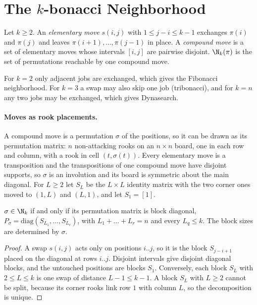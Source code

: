 
\section{The $k$-bonacci Neighborhood}

\begin{definition}
Let $k\geq 2$. An \emph{elementary move} $s(i,j)$ with $1\leq j-i\leq k-1$
exchanges $\pi(i)$ and $\pi(j)$ and leaves $\pi(i+1),\dots,\pi(j-1)$ in
place. A \emph{compound move} is a set of elementary moves whose
intervals $[i,j]$ are pairwise disjoint. $\N_k(\pi)$ is the set of
permutations reachable by one compound move.
\end{definition}

For $k=2$ only adjacent jobs are exchanged, which gives the Fibonacci
neighborhood. For $k=3$ a swap may also skip one job (tribonacci), and for
$k=n$ any two jobs may be exchanged, which gives Dynasearch.

\paragraph{Moves as rook placements.} A compound move is a permutation
$\sigma$ of the positions, so it can be drawn as its permutation matrix:
$n$ non-attacking rooks on an $n\times n$ board, one in each row and
column, with a rook in cell $(t,\sigma(t))$. Every elementary move is a transposition and the
transpositions of one compound move have disjoint supports, so $\sigma$ is
an involution and its board is symmetric about the main diagonal. For
$L\geq 2$ let $S_L$ be the $L\times L$ identity matrix with the two corner
ones moved to $(1,L)$ and $(L,1)$, and let $S_1=[1]$.

\begin{lemma}\label{lem:blocks}
$\sigma\in\N_k$ if and only if its permutation matrix is block diagonal,
$P_\sigma=\mathrm{diag}(S_{L_1},\dots,S_{L_r})$, with
$L_1+\dots+L_r=n$ and every $L_q\leq k$. The block sizes are determined
by $\sigma$.
\end{lemma}
\begin{proof}
A swap $s(i,j)$ acts only on positions $i..j$, so it is the block
$S_{j-i+1}$ placed on the diagonal at rows $i..j$. Disjoint intervals
give disjoint diagonal blocks, and the untouched positions are blocks
$S_1$. Conversely, each block $S_L$ with $2\leq L\leq k$ is one swap of
distance $L-1\leq k-1$. A block $S_L$ with $L\geq 2$ cannot be split,
because its corner rooks link row $1$ with column $L$, so the
decomposition is unique.
\end{proof}

